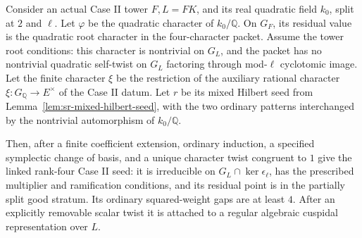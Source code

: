 \begin{srproposition}
\label{prop:sr-induced-case-two-seed}
Consider an actual Case II tower \(F,L=FK\), and its real
quadratic field \(k_0\), split at \(2\) and \(\ell\).
Let \(\varphi\) be the quadratic character of \(k_0/\mathbb Q\).
On \(G_F\), its residual value is the quadratic root character
in the four-character packet.
Assume the tower root conditions: this character is nontrivial
on \(G_L\), and the packet has no nontrivial quadratic
self-twist on \(G_L\) factoring through mod-\(\ell\)
cyclotomic image.
Let the finite character \(\xi\) be the restriction of the
auxiliary rational character \(\xi:G_{\mathbb Q}\to E^\times\)
of the Case II datum. Let \(r\) be its mixed Hilbert seed from
Lemma~\ref{lem:sr-mixed-hilbert-seed}, with the two ordinary
patterns interchanged by the nontrivial automorphism of
\(k_0/\mathbb Q\).

Then, after a finite coefficient extension, ordinary induction,
a specified symplectic change of basis, and a unique character
twist congruent to \(1\) give the linked rank-four Case II seed:
it is irreducible on \(G_L\cap\ker\epsilon_\ell\), has the
prescribed multiplier and ramification conditions, and its
residual point is in the partially split good stratum.
Its ordinary squared-weight gaps are at least \(4\).
After an explicitly removable scalar twist it is attached to a
regular algebraic cuspidal representation over \(L\).
\end{srproposition}
